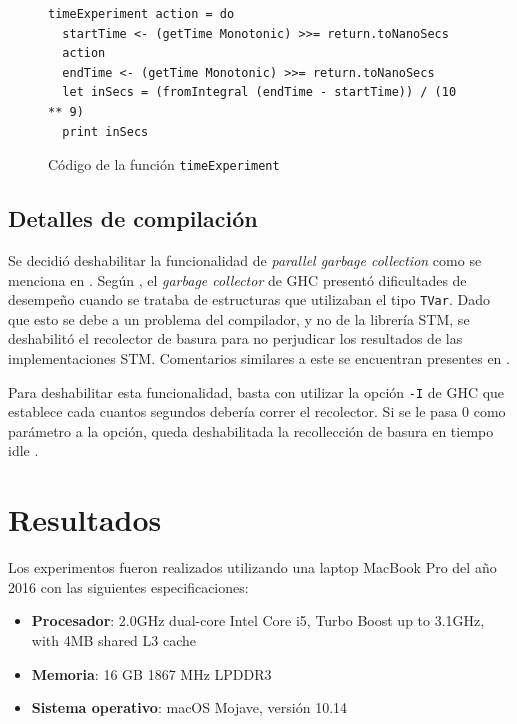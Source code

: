 \begin{figure}[!h]
    \centering
\begin{verbatim}
timeExperiment action = do
  startTime <- (getTime Monotonic) >>= return.toNanoSecs
  action
  endTime <- (getTime Monotonic) >>= return.toNanoSecs
  let inSecs = (fromIntegral (endTime - startTime)) / (10 ** 9)
  print inSecs
\end{verbatim}
\caption{Código de la función \texttt{timeExperiment}}
    \label{fig:timeExperiment}
\end{figure}

\subsection{Detalles de compilación}
Se decidió deshabilitar la funcionalidad de \emph{parallel garbage collection} como se menciona en \cite{linked-list}.
Según \cite{linked-list}, el \emph{garbage collector} de GHC presentó dificultades de desempeño cuando se trataba de estructuras que utilizaban el tipo \texttt{TVar}.
Dado que esto se debe a un problema del compilador, y no de la librería STM, se deshabilitó el recolector de basura para no perjudicar los resultados de las implementaciones STM.
Comentarios similares a este se encuentran presentes en \cite{abq}.

Para deshabilitar esta funcionalidad, basta con utilizar la opción \texttt{-I} de GHC que establece cada cuantos segundos debería correr el recolector. Si se le pasa 0 como parámetro a la opción, queda deshabilitada la recollección de basura en tiempo idle \cite{garbagecollection}.

\section{Resultados}\label{sec:results}

Los experimentos fueron realizados utilizando una laptop MacBook Pro del año 2016 con las siguientes especificaciones:

\begin{itemize}
    \item \textbf{Procesador}: 2.0GHz dual-core Intel Core i5, Turbo Boost up to 3.1GHz, with 4MB shared L3 cache
    \item \textbf{Memoria}: 16 GB 1867 MHz LPDDR3
    \item \textbf{Sistema operativo}: macOS Mojave, versión 10.14
\end{itemize}

